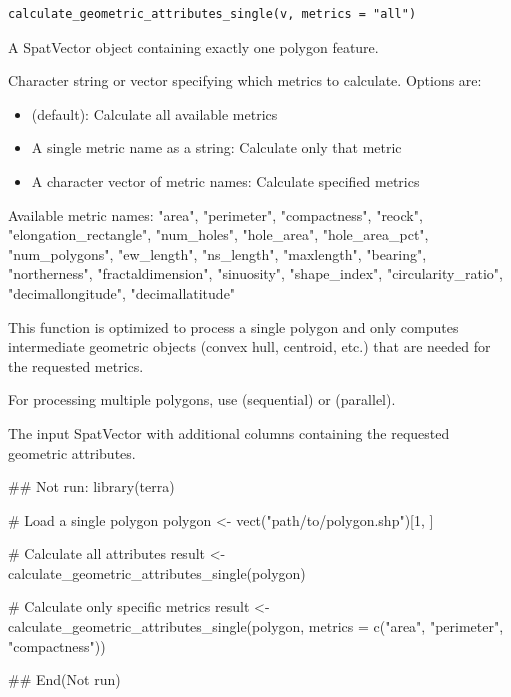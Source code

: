 \documentclass[letterpaper]{book}
\begin{document}
%
\begin{Usage}
\begin{verbatim}
calculate_geometric_attributes_single(v, metrics = "all")
\end{verbatim}
\end{Usage}
%
\begin{Arguments}
\begin{ldescription}
\item[\code{v}] A SpatVector object containing exactly one polygon feature.

\item[\code{metrics}] Character string or vector specifying which metrics to calculate.
Options are:
\begin{itemize}

\item{}  (default): Calculate all available metrics
\item{} A single metric name as a string: Calculate only that metric
\item{} A character vector of metric names: Calculate specified metrics

\end{itemize}

Available metric names: "area", "perimeter", "compactness", "reock",
"elongation\_rectangle", "num\_holes", "hole\_area", "hole\_area\_pct",
"num\_polygons", "ew\_length", "ns\_length", "maxlength", "bearing",
"northerness", "fractaldimension", "sinuosity", "shape\_index",
"circularity\_ratio", "decimallongitude", "decimallatitude"
\end{ldescription}
\end{Arguments}
%
\begin{Details}
This function is optimized to process a single polygon and only computes
intermediate geometric objects (convex hull, centroid, etc.) that are needed
for the requested metrics.

For processing multiple polygons, use 
(sequential) or  (parallel).
\end{Details}
%
\begin{Value}
The input SpatVector with additional columns containing the requested
geometric attributes.
\end{Value}
%
\begin{Examples}
\begin{ExampleCode}
## Not run: 
library(terra)

# Load a single polygon
polygon <- vect("path/to/polygon.shp")[1, ]

# Calculate all attributes
result <- calculate_geometric_attributes_single(polygon)

# Calculate only specific metrics
result <- calculate_geometric_attributes_single(polygon,
  metrics = c("area", "perimeter", "compactness"))

## End(Not run)
\end{ExampleCode}
\end{Examples}
\end{document}
